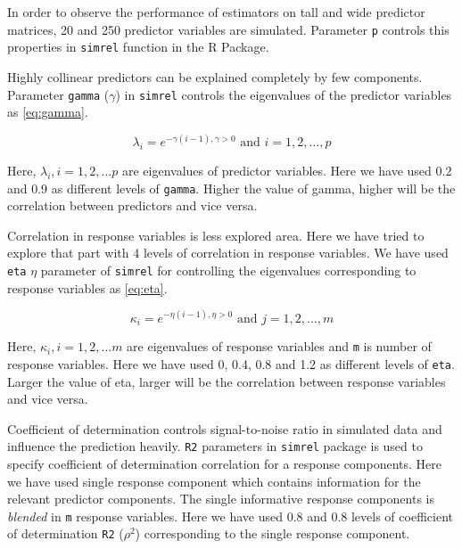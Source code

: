 \documentclass[12pt,3p,authoryear]{elsarticle}
\providecommand{\tightlist}{%
  \setlength{\itemsep}{0pt}\setlength{\parskip}{0pt}}
\begin{document}
\begin{description}
\tightlist
\item[\textbf{Number of predictors:}]
In order to observe the performance of estimators on tall and wide
predictor matrices, 20 and 250 predictor variables are simulated.
Parameter \texttt{p} controls this properties in \texttt{simrel}
function in the R Package.
\item[\textbf{Multicollinearity in predictor variables:}]
Highly collinear predictors can be explained completely by few
components. Parameter \texttt{gamma} (\(\gamma\)) in \texttt{simrel}
controls the eigenvalues of the predictor variables as \eqref{eq:gamma}.

\begin{equation}
  \lambda_i = e^{-\gamma(i - 1), \gamma > 0} \text{ and } i = 1, 2, \ldots, p
  \label{eq:gamma}
  \end{equation}

Here, \(\lambda_i, i = 1, 2, \ldots p\) are eigenvalues of predictor
variables. Here we have used 0.2 and 0.9 as different levels of
\texttt{gamma}. Higher the value of gamma, higher will be the
correlation between predictors and vice versa.
\item[\textbf{Correlation in response variables:}]
Correlation in response variables is less explored area. Here we have
tried to explore that part with 4 levels of correlation in response
variables. We have used \texttt{eta} \(\eta\) parameter of
\texttt{simrel} for controlling the eigenvalues corresponding to
response variables as \eqref{eq:eta}.

\begin{equation}
  \kappa_i = e^{-\eta(i - 1), \eta > 0} \text{ and } j = 1, 2, \ldots, m
  \label{eq:eta}
\end{equation}

Here, \(\kappa_i, i = 1, 2, \ldots m\) are eigenvalues of response
variables and \texttt{m} is number of response variables. Here we have
used 0, 0.4, 0.8 and 1.2 as different levels of \texttt{eta}. Larger the
value of eta, larger will be the correlation between response variables
and vice versa.
\item[\textbf{Coefficient of determination:}]
Coefficient of determination controls signal-to-noise ratio in simulated
data and influence the prediction heavily. \texttt{R2} parameters in
\texttt{simrel} package is used to specify coefficient of determination
correlation for a response components. Here we have used single response
component which contains information for the relevant predictor
components. The single informative response components is \emph{blended}
in \texttt{m} response variables. Here we have used 0.8 and 0.8 levels
of coefficient of determination \texttt{R2} (\(\rho^2\)) corresponding
to the single response component.
\end{description}
\end{document}
